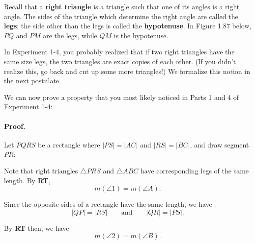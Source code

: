 \documentclass[12pt]{book} %
\begin{document}
Recall that a \textbf{right triangle} is a triangle such that one of its angles is a right angle. The sides of the triangle which determine the right angle are called the \textbf{legs}; the side other than the legs is called the \textbf{hypotenuse}. In Figure 1.87 below, $\overline{PQ}$ and $\overline{PM}$ are the legs, while $\overline{QM}$ is the hypotenuse.


In Experiment 1-4, you probably realized that if two right triangles have the same size legs, the two triangles are exact copies of each other. (If you didn't realize this, go back and cut up some more triangles!) We formalize this notion in the next postulate.


We can now prove a property that you most likely noticed in Parts 1 and 4 of Experiment 1-4:



\paragraph{Proof.}
Let $PQRS$ be a rectangle where $|PS|=|AC|$ and $|RS|=|BC|$, and draw segment $\overline{PR}$:


Note that right triangles $\triangle PRS$ and $\triangle ABC$ have corresponding legs of the same length. By \textbf{RT},
\[
m(\angle 1)=m(\angle A).
\]

Since the opposite sides of a rectangle have the same length, we have
\[
|QP|=|RS| \qquad \text{and} \qquad |QR|=|PS|.
\]

By \textbf{RT} then, we have
\[
m(\angle 2)=m(\angle B).
\]
\end{document}
